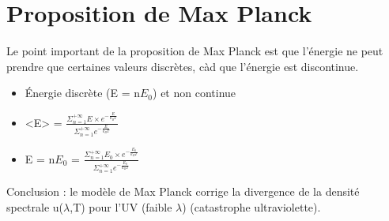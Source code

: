 \documentclass{article}
\begin{document}
\section{Proposition de Max Planck}
Le point important de la proposition de Max Planck est que l'énergie ne peut prendre que certaines valeurs discrètes, càd que l'énergie est discontinue.
\begin{itemize}
    \item Énergie discrète (E = n$E_{0}$) et non continue
    \item <E> = $\frac{\Sigma_{n=1}^{+\infty} E \times e^{-\frac{E}{k_{B}T}}}{\Sigma_{n=1}^{+\infty} e^{-\frac{E}{k_{B}T}}}$
    \item E = n$E_{0}$ = $\frac{\Sigma_{n=1}^{+\infty} E_{0} \times e^{-\frac{E_{0}}{k_{B}T}}}{\Sigma_{n=1}^{+\infty} e^{-\frac{E_{0}}{k_{B}T}}}$
\end{itemize}
Conclusion : le modèle de Max Planck corrige la divergence de la densité spectrale u($\lambda$,T) pour l'UV (faible $\lambda$) (catastrophe ultraviolette).
\end{document}
